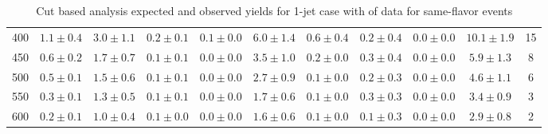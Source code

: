 \begin{table}
{\begin{center}
\begin{tabular}{l c c c c c c c c c c }
400 & $1.1\pm0.4$ & $3.0\pm1.1$ & $0.2\pm0.1$ & $0.1\pm0.0$ & $6.0\pm1.4$ & $0.6\pm0.4$ & $0.2\pm0.4$ & $0.0\pm0.0$ & $10.1\pm1.9$ & 15 \\
450 & $0.6\pm0.2$ & $1.7\pm0.7$ & $0.1\pm0.1$ & $0.0\pm0.0$ & $3.5\pm1.0$ & $0.2\pm0.0$ & $0.3\pm0.4$ & $0.0\pm0.0$ & $5.9\pm1.3$ & 8 \\
500 & $0.5\pm0.1$ & $1.5\pm0.6$ & $0.1\pm0.1$ & $0.0\pm0.0$ & $2.7\pm0.9$ & $0.1\pm0.0$ & $0.2\pm0.3$ & $0.0\pm0.0$ & $4.6\pm1.1$ & 6 \\
550 & $0.3\pm0.1$ & $1.3\pm0.5$ & $0.1\pm0.1$ & $0.0\pm0.0$ & $1.7\pm0.6$ & $0.1\pm0.0$ & $0.3\pm0.3$ & $0.0\pm0.0$ & $3.4\pm0.9$ & 3 \\
600 & $0.2\pm0.1$ & $1.0\pm0.4$ & $0.1\pm0.0$ & $0.0\pm0.0$ & $1.6\pm0.6$ & $0.1\pm0.0$ & $0.1\pm0.3$ & $0.0\pm0.0$ & $2.9\pm0.8$ & 2 \\
\hline
\end{tabular}
\end{center}
}
\caption{Cut based analysis expected and observed yields for 1-jet case with \intlumi of data for same-flavor events}
\label{tab:cutbase_inputs_sf_1j_data}
\end{table}

